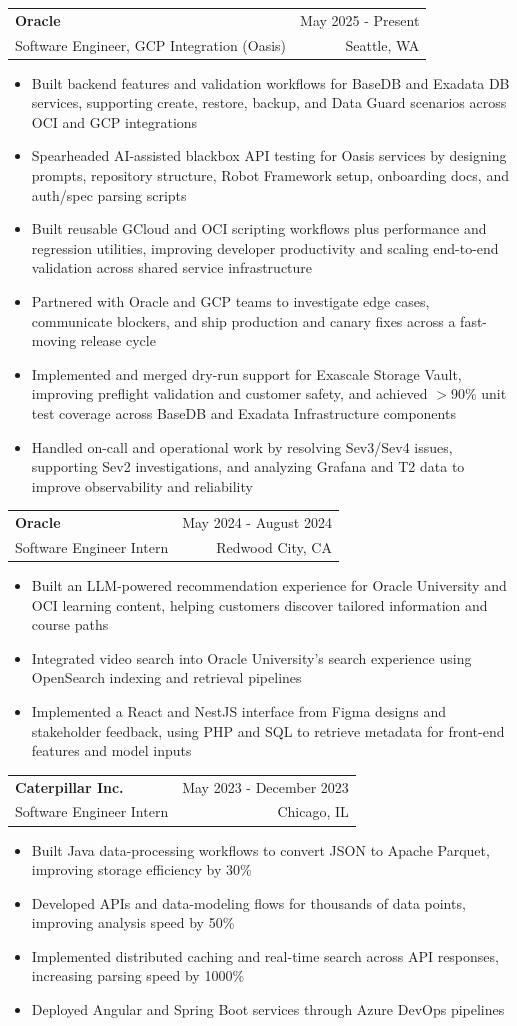 \documentclass[letterpaper,11pt]{article}
\makeatletter
\newcommand{\resumeItem}[1]{
  \item\small{
    {#1 \vspace{-2pt}}
  }
}
\newcommand{\resumeSubheading}[4]{
  \vspace{-2pt}\item
    \begin{tabular*}{0.97\textwidth}[t]{l@{\extracolsep{\fill}}r}
      \textbf{#1} & #2 \\
      {\small#3} & {\small #4} \\
    \end{tabular*}\vspace{-7pt}
}
\newcommand{\resumeItemListStart}{\begin{itemize}}
\newcommand{\resumeItemListEnd}{\end{itemize}\vspace{-5pt}}
\makeatother
\begin{document}
    \resumeSubheading
  {Oracle}{May 2025 - Present}
  {Software Engineer, GCP Integration (Oasis)}{Seattle, WA}
  \resumeItemListStart
    \resumeItem{Built backend features and validation workflows for BaseDB and Exadata DB services, supporting create, restore, backup, and Data Guard scenarios across OCI and GCP integrations}
    \resumeItem{Spearheaded AI-assisted blackbox API testing for Oasis services by designing prompts, repository structure, Robot Framework setup, onboarding docs, and auth/spec parsing scripts}
    \resumeItem{Built reusable GCloud and OCI scripting workflows plus performance and regression utilities, improving developer productivity and scaling end-to-end validation across shared service infrastructure}
    \resumeItem{Partnered with Oracle and GCP teams to investigate edge cases, communicate blockers, and ship production and canary fixes across a fast-moving release cycle}
    \resumeItem{Implemented and merged dry-run support for Exascale Storage Vault, improving preflight validation and customer safety, and achieved $>$90\% unit test coverage across BaseDB and Exadata Infrastructure components}
    \resumeItem{Handled on-call and operational work by resolving Sev3/Sev4 issues, supporting Sev2 investigations, and analyzing Grafana and T2 data to improve observability and reliability}
  \resumeItemListEnd

    \resumeSubheading
      {Oracle}{May 2024 - August 2024}
      {Software Engineer Intern}{Redwood City, CA}
      \resumeItemListStart
        \resumeItem{Built an LLM-powered recommendation experience for Oracle University and OCI learning content, helping customers discover tailored information and course paths}
        \resumeItem{Integrated video search into Oracle University's search experience using OpenSearch indexing and retrieval pipelines}
        \resumeItem{Implemented a React and NestJS interface from Figma designs and stakeholder feedback, using PHP and SQL to retrieve metadata for front-end features and model inputs}
      \resumeItemListEnd

    \resumeSubheading
      {Caterpillar Inc.}{May 2023 - December 2023}
      {Software Engineer Intern}{Chicago, IL}
      \resumeItemListStart
        \resumeItem{Built Java data-processing workflows to convert JSON to Apache Parquet, improving storage efficiency by 30\%}
        \resumeItem{Developed APIs and data-modeling flows for thousands of data points, improving analysis speed by 50\%}
        \resumeItem{Implemented distributed caching and real-time search across API responses, increasing parsing speed by 1000\%}
        \resumeItem{Deployed Angular and Spring Boot services through Azure DevOps pipelines}
      \resumeItemListEnd
\end{document}
